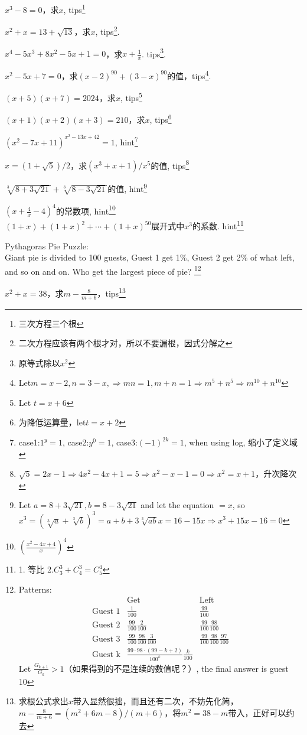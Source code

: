 \documentclass[algebra.tex]{subfiles}
\begin{document}
$x^3-8=0$，求$x$, tips\footnote{三次方程三个根}

$x^2+x=13+\sqrt{13}$，求$x$, tips\footnote{二次方程应该有两个根才对，所以不要漏根，因式分解之}.

$x^4-5x^3+8x^2-5x+1=0$，求$x+ \frac{1}{x}$. tips\footnote{原等式除以$x^2$}.

$x^2-5x+7=0$，求$(x-2)^{90}+(3-x)^{90}$的值，tips\footnote{Let$m=x-2, n=3-x, \Rightarrow mn=1, m+n=1 \Rightarrow m^5+n^5 \Rightarrow m^{10}+n^{10}$}.

$(x+5)(x+7)=2024$，求$x$, tips\footnote{Let $t=x+6$}

$(x+1)(x+2)(x+3)=210$，求$x$, tips\footnote{为降低运算量，let$t=x+2$}

$(x^2-7x+11)^{x^2-13x+42}=1$, hint\footnote{case1:$1^y=1$, case2:$y^0=1$, case3:$(-1)^{2k}=1$, when using log, 缩小了定义域}

$x=(1+\sqrt{5})/2$，求$(x^3+x+1)/x^5$的值, tips\footnote{$\sqrt{5}=2x-1 \Rightarrow 4x^2-4x+1=5 \Rightarrow x^2-x-1=0 \Rightarrow x^2=x+1$，升次降次}

$\sqrt[3]{8+3\sqrt{21}}+\sqrt[3]{8-3\sqrt{21}}$的值, hint\footnote{Let $a=8+3\sqrt{21}, b=8-3\sqrt{21}$ and let the equation $=x$, so\\
  $x^3=(\sqrt[3]{a}+\sqrt[3]{b})^3=a+b+3\sqrt[3]{ab}x=16-15x \Rightarrow x^3+15x-16=0$}

$(x+\frac{4}{x}-4)^4$的常数项, hint\footnote{$(\frac{x^2-4x+4}{x})^4$}\\
$(1+x)+(1+x)^2+\cdots+(1+x)^{50}$展开式中$x^3$的系数. hint\footnote{1. 等比 2.$C_3^3+C_4^3=C_5^4$}

Pythagoras Pie Puzzle:\\
Giant pie is divided to 100 guests, Guest 1 get 1\%, Guest 2 get 2\% of what left, and so on and on. Who get the largest piece of pie?
\footnote{
Patterns:\\
\[\begin{array}{cll}
    \mbox{} & \mbox{Get} & \mbox{Left}\\
    \mbox{Guest 1}& \frac{1}{100} & \frac{99}{100}\\
    \mbox{Guest 2}& \frac{99}{100}\frac{2}{100}&\frac{99}{100}\frac{98}{100}\\
    \mbox{Guest 3}& \frac{99}{100}\frac{98}{100}\frac{3}{100}&\frac{99}{100}\frac{98}{100}\frac{97}{100}\\
    \mbox{Guest k}& \frac{99\cdot 98\cdot (99-k+2)}{100^k}\frac{k}{100}&
  \end{array}\]
Let $\frac{G_{k+1}}{G_k} > 1$（如果得到的不是连续的数值呢？）, the final answer is guest 10
}

$x^2+x=38$，求$m-\frac{8}{m+6}$，tips\footnote{求根公式求出$x$带入显然很拙，而且还有二次，不妨先化简，$m-\frac{8}{m+6}=(m^2+6m-8)/(m+6)$，将$m^2=38-m$带入，正好可以约去}
\end{document}

